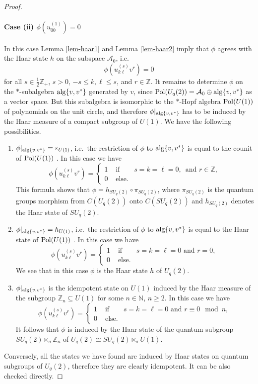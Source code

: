 \documentclass[12pt]{amsart}
\theoremstyle{definition}
\theoremstyle{remark}
\numberwithin{equation}{section}
\begin{document}
\begin{proof}
\paragraph{Case (ii) $\phi(u^{(1)}_{00})=0$}
In this case Lemma \ref{lem-haar1} and Lemma \ref{lem-haar2} imply that $\phi$
agrees with the Haar state $h$ on the subspace $\mathcal{A}_0$, i.e.\
\[
\phi(u^{(s)}_{k\ell} v^r) =0
\]
for all $s\in\frac{1}{2}\mathbb{Z}_+$, $s>0$, $-s\le k,\ell\le s$, and
$r\in\mathbb{Z}$. It remains to determine $\phi$ on the $*$-subalgebra
 ${\rm alg}\{v,v^*\}$ generated by $v$, since ${\rm
  Pol}(U_q(2))=\mathcal{A}_0\oplus {\rm alg}\{v,v^*\}$ as a vector space. But this subalgebra is isomorphic to
the $*$-Hopf algebra ${\rm Pol}(U(1))$ of
polynomials on the unit circle, and therefore $\phi|_{{\rm alg}\{v,v^*\}}$ has
to be induced by the Haar measure of a compact subgroup of $U(1)$. We have the
following possibilities.
\begin{enumerate}
\item
$\phi|_{{\rm alg}\{v,v^*\}}=\varepsilon_{U(1)}$, i.e.\ the restriction of
$\phi$ to ${\rm alg}\{v,v^*\}$ is equal to the counit of ${\rm Pol}(U(1))$ . In this case we have
\[
\phi(u^{(s)}_{k\ell} v^r) =\left\{
\begin{array}{cll}
1 & \mbox{ if } & s=k=\ell=0,\, \mbox{ and } r\in\mathbb{Z}, \\
0 & \mbox { else}. &
\end{array}\right.
\]
This formula shows that $\phi=h_{SU_q(2)}\circ \pi_{SU_q(2)}$, where
$\pi_{SU_q(2)}$ is the quantum groups morphism from $C(U_q(2))$ onto $C(SU_q(2))$
and $h_{SU_q(2)}$ denotes the Haar state of $SU_q(2)$.
\item
$\phi|_{{\rm alg}\{v,v^*\}}=h_{U(1)}$, i.e.\ the restriction of
$\phi$ to ${\rm alg}\{v,v^*\}$ is equal to the Haar state of ${\rm Pol}(U(1))$ . In this case we have
\[
\phi(u^{(s)}_{k\ell} v^r) =\left\{
\begin{array}{cll}
1 & \mbox{ if } & s=k=\ell=0 \mbox{ and } r=0, \\
0 & \mbox { else}. &
\end{array}\right.
\]
We see that in this case $\phi$ is the Haar state $h$ of $U_q(2)$.
\item
$\phi|_{{\rm alg}\{v,v^*\}}$ is the idempotent state on $U(1)$ induced by the
Haar measure of the subgroup $\mathbb{Z}_n\subseteq U(1)$ for some $n\in\mathbb{N}$,
$n\ge 2$. In this case we have
\[
\phi(u^{(s)}_{k\ell} v^r) =\left\{
\begin{array}{cll}
1 & \mbox{ if } & s=k=\ell=0 \mbox{ and } r\equiv 0\mod n, \\
0 & \mbox { else}. &
\end{array}\right.
\]
It follows that $\phi$ is induced by the Haar state of the quantum subgroup
$SU_q(2)\ltimes_\sigma \mathbb{Z}_n$ of $U_q(2)\cong SU_q(2)\ltimes_\sigma U(1)$.
\end{enumerate}
Conversely, all the states we have found are induced by Haar states on
quantum subgroups of $U_q(2)$, therefore they are clearly idempotent. It can be also checked directly.
\end{proof}
\end{document}
